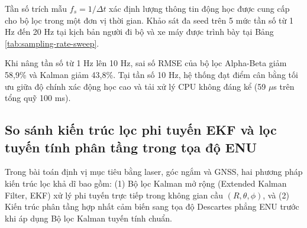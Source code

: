 \hspace{0.5cm} Tần số trích mẫu $f_s = 1/\Delta t$ xác định lượng thông tin động học được cung cấp cho bộ lọc trong một đơn vị thời gian. Khảo sát đa seed trên 5 mức tần số từ 1 Hz đến 20 Hz tại kịch bản người đi bộ và xe máy được trình bày tại Bảng \ref{tab:sampling-rate-sweep}.

\begin{table}[H]
\centering
\caption{Đánh giá sai số định vị RMSE theo tần số trích mẫu hệ thống $f_s$}
\label{tab:sampling-rate-sweep}
\end{table}

Khi nâng tần số từ 1 Hz lên 10 Hz, sai số RMSE của bộ lọc Alpha-Beta giảm 58,9\% và Kalman giảm 43,8\%. Tại tần số 10 Hz, hệ thống đạt điểm cân bằng tối ưu giữa độ chính xác động học cao và tải xử lý CPU không đáng kể (59 $\mu$s trên tổng quỹ 100 ms).

\subsection{So sánh kiến trúc lọc phi tuyến EKF và lọc tuyến tính phân tầng trong tọa độ ENU}

\hspace{0.5cm} Trong bài toán định vị mục tiêu bằng laser, góc ngắm và GNSS, hai phương pháp kiến trúc lọc khả dĩ bao gồm: (1) Bộ lọc Kalman mở rộng (Extended Kalman Filter, EKF) xử lý phi tuyến trực tiếp trong không gian cầu $(R, \theta, \phi)$, và (2) Kiến trúc phân tầng hợp nhất cảm biến sang tọa độ Descartes phẳng ENU trước khi áp dụng Bộ lọc Kalman tuyến tính chuẩn.

